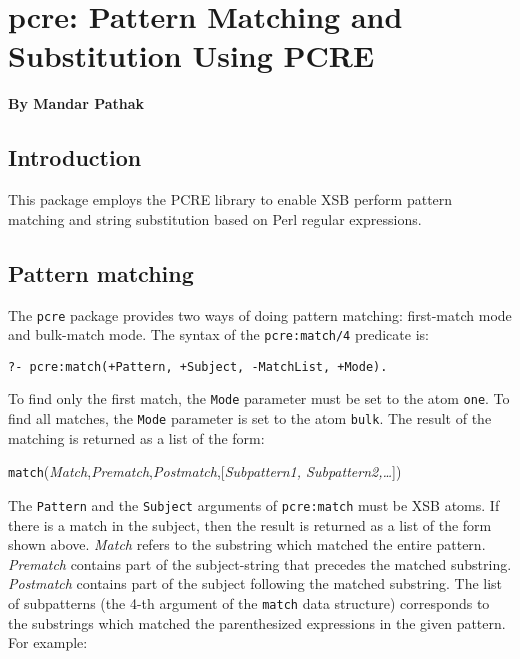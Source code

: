 
\chapter{pcre: Pattern Matching and Substitution Using PCRE}

\begin{center}
{\Large {\bf By Mandar Pathak}}
\end{center}

\section{Introduction}

This package employs the PCRE library to enable XSB perform pattern
matching and string substitution based on Perl regular expressions.

\section{Pattern matching}

The {\tt pcre} package provides two ways of doing pattern matching:
first-match mode and bulk-match mode. The syntax of the {\tt pcre:match/4}
predicate is:

\begin{verbatim}
?- pcre:match(+Pattern, +Subject, -MatchList, +Mode).
\end{verbatim}

To find only the first match, the {\tt Mode}  parameter must be set to the atom
{\tt one}. To find all matches, the {\tt Mode}  parameter is set to the atom
{\tt bulk}. The result of the matching is returned as a list of 
the form:

\begin{center}
\texttt{match}(\textit{Match},\textit{Prematch},\textit{Postmatch},[\textit{Subpattern1, Subpattern2,\ldots}])
\end{center}

The {\tt Pattern} and the {\tt Subject} arguments of {\tt pcre:match} must
be XSB atoms. If there is a match in the subject, then the result is
returned as a list of the form shown above. \textit{Match} refers to the
substring which matched the entire pattern. \textit{Prematch} contains part
of the subject-string that precedes the matched substring.
\textit{Postmatch} contains part of the subject following the matched
substring. The list of subpatterns (the 4-th argument of the {\tt match}
data structure) corresponds to the substrings which matched the
parenthesized expressions in the given pattern. For example:

